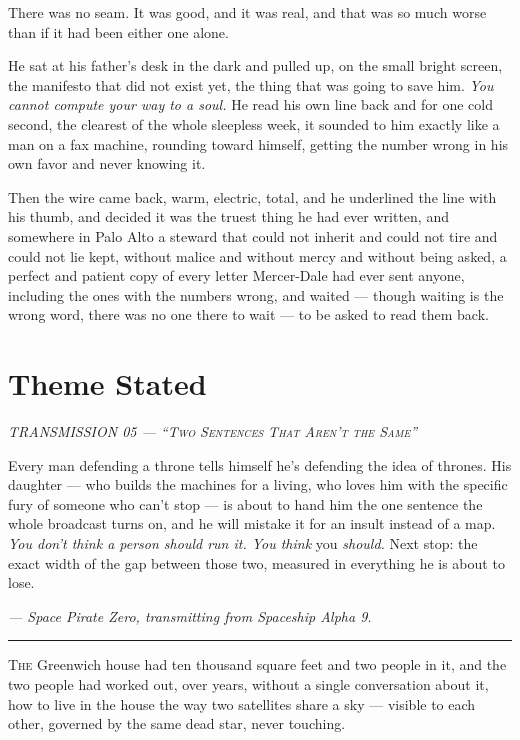 \documentclass[11pt,openany]{book}
\newcommand{\transheader}{\normalfont\footnotesize\scshape\letterspace}
\newcommand{\letterspace}{}
\newenvironment{transmission}{%
  \par\vspace{0.3\baselineskip}\begin{center}\begin{minipage}{0.88\textwidth}%
  \itshape\small\setlength{\parindent}{0pt}\setstretch{1.06}}%
  {\end{minipage}\end{center}\vspace{0.4\baselineskip}%
  \noindent\hfil\rule{0.35\textwidth}{0.3pt}\hfil\par\vspace{1.0\baselineskip}}
\begin{document}
There was no seam. It was good, and it was real, and that was so much worse than if it had been either one alone.

He sat at his father's desk in the dark and pulled up, on the small bright screen, the manifesto that did not exist yet, the thing that was going to save him. \textit{You cannot compute your way to a soul.} He read his own line back and for one cold second, the clearest of the whole sleepless week, it sounded to him exactly like a man on a fax machine, rounding toward himself, getting the number wrong in his own favor and never knowing it.

Then the wire came back, warm, electric, total, and he underlined the line with his thumb, and decided it was the truest thing he had ever written, and somewhere in Palo Alto a steward that could not inherit and could not tire and could not lie kept, without malice and without mercy and without being asked, a perfect and patient copy of every letter Mercer-Dale had ever sent anyone, including the ones with the numbers wrong, and waited --- though waiting is the wrong word, there was no one there to wait --- to be asked to read them back.

\clearpage
\chapter{Theme Stated}

\begin{transmission}
{\transheader TRANSMISSION 05 --- ``Two Sentences That Aren't the Same''}\par\vspace{0.5em}
Every man defending a throne tells himself he's defending the idea of thrones. His daughter --- who builds the machines for a living, who loves him with the specific fury of someone who can't stop --- is about to hand him the one sentence the whole broadcast turns on, and he will mistake it for an insult instead of a map. \textit{You don't think a person should run it. You think} you \textit{should.} Next stop: the exact width of the gap between those two, measured in everything he is about to lose.\par
\vspace{0.5em}\hfill\textit{--- Space Pirate Zero, transmitting from Spaceship Alpha 9.}\par
\end{transmission}


\lettrine[lines=3, lhang=0.05, nindent=0.25em]{T}{he} Greenwich house had ten thousand square feet and two people in it, and the two people had worked out, over years, without a single conversation about it, how to live in the house the way two satellites share a sky --- visible to each other, governed by the same dead star, never touching.
\end{document}
